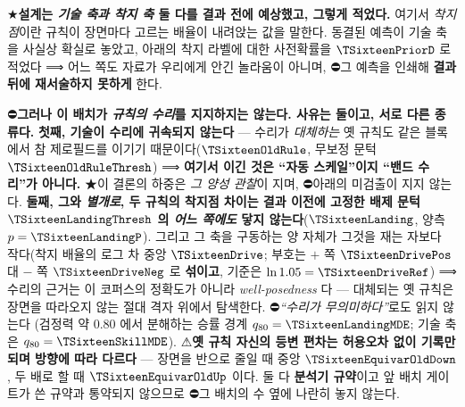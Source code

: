 \documentclass[11pt]{report}
\numberwithin{equation}{chapter}
\numberwithin{figure}{chapter}
\numberwithin{table}{chapter}
\begin{document}
★\textbf{설계는 \emph{기술 축과 착지 축} 둘 다를 결과 전에 예상했고, 그렇게 적었다.}
여기서 \emph{착지점}이란 규칙이 장면마다 고르는 배율이 내려앉는 값을 말한다. 동결된 예측이
기술 축을 사실상 확실로 놓았고, 아래의 착지 라벨에 대한 사전확률을 $\TSixteenPriorD$ 로
적었다 ⟹ 어느 쪽도 자료가 우리에게 안긴 놀라움이 아니며, ⛔그 예측을 인쇄해 \textbf{결과
뒤에 재서술하지 못하게} 한다.

⛔\textbf{그러나 이 배치가 \emph{규칙의 수리}를 지지하지는 않는다. 사유는 둘이고, 서로 다른
종류다.} \textbf{첫째, 기술이 수리에 귀속되지 않는다} --- 수리가 \emph{대체하는} 옛 규칙도
같은 블록에서 참 제로필드를 이기기 때문이다($\TSixteenOldRule$, 무보정 문턱
$\TSixteenOldRuleThresh$) ⟹ \textbf{여기서 이긴 것은 ``자동 스케일''이지 ``밴드 수리''가
아니다.} ★이 결론의 하중은 \emph{그 양성 관찰}이 지며, ⛔아래의 미검출이 지지 않는다.
\textbf{둘째, 그와 \emph{별개로}, 두 규칙의 착지점 차이는 결과 이전에 고정한 배제 문턱
$\TSixteenLandingThresh$ 의 \emph{어느 쪽에도} 닿지 않는다}($\TSixteenLanding$, 양측
$p = \TSixteenLandingP$). 그리고 그 축을 구동하는 양 자체가 그것을 재는 자보다 작다(착지
배율의 로그 차 중앙 $\TSixteenDrive$; 부호는 $+$ 쪽 $\TSixteenDrivePos$ 대 $-$ 쪽
$\TSixteenDriveNeg$ 로 \textbf{섞이고}, 기준은 $\ln 1.05 = \TSixteenDriveRef$) ⟹ 수리의
근거는 이 코퍼스의 정확도가 아니라 \emph{well-posedness} 다 --- 대체되는 옛 규칙은 장면을
따라오지 않는 절대 격자 위에서 탐색한다. ⛔\emph{``수리가 무의미하다''}로도 읽지 않는다
(검정력 약 $0.80$ 에서 분해하는 승률 경계 $q_{80} = \TSixteenLandingMDE$; 기술 축은
$q_{80} = \TSixteenSkillMDE$).
⚠\textbf{옛 규칙 자신의 등변 편차는 허용오차 없이 기록만 되며 방향에 따라 다르다} ---
장면을 반으로 줄일 때 중앙 $\TSixteenEquivarOldDown$, 두 배로 할 때
$\TSixteenEquivarOldUp$ 이다. 둘 다 \textbf{분석기 규약}이고 앞 배치 게이트가 쓴 규약과
통약되지 않으므로 ⛔그 배치의 수 옆에 나란히 놓지 않는다.
\end{document}
